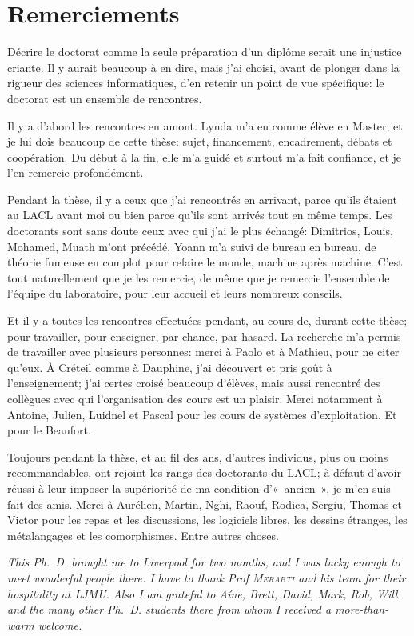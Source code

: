 \chapter{Remerciements}

Décrire le doctorat comme la seule préparation d'un diplôme serait une injustice criante.
Il y aurait beaucoup à en dire, mais j'ai choisi, avant de plonger dans la rigueur des sciences informatiques, d'en retenir un point de vue spécifique: le doctorat est un ensemble de rencontres.

Il y a d'abord les rencontres en amont.
Lynda m'a eu comme élève en Master, et je lui dois beaucoup de cette thèse: sujet, financement, encadrement, débats et coopération.
Du début à la fin, elle m'a guidé et surtout m'a fait confiance, et je l'en remercie profondément.

Pendant la thèse, il y a ceux que j'ai rencontrés en arrivant, parce qu'ils étaient au LACL avant moi ou bien parce qu'ils sont arrivés tout en même temps.
Les doctorants sont sans doute ceux avec qui j'ai le plus échangé: Dimitrios, Louis, Mohamed, Muath m'ont précédé, Yoann m'a suivi de bureau en bureau, de théorie fumeuse en complot pour refaire le monde, machine après machine.
C'est tout naturellement que je les remercie, de même que je remercie l'ensemble de l'équipe du laboratoire, pour leur accueil et leurs nombreux conseils.

Et il y a toutes les rencontres effectuées pendant, au cours de, durant cette thèse; pour travailler, pour enseigner, par chance, par hasard.
La recherche m'a permis de travailler avec plusieurs personnes: merci à Paolo et à Mathieu, pour ne citer qu'eux.
À Créteil comme à Dauphine, j'ai découvert et pris goût à l'enseignement; j'ai certes croisé beaucoup d'élèves, mais aussi rencontré des collègues avec qui l'organisation des cours est un plaisir.
Merci notamment à Antoine, Julien, Luidnel et Pascal pour les cours de systèmes d'exploitation.
Et pour le Beaufort.

Toujours pendant la thèse, et au fil des ans, d'autres individus, plus ou moins recommandables, ont rejoint les rangs des doctorants du LACL; à défaut d'avoir réussi à leur imposer la supériorité de ma condition d'« ancien », je m'en suis fait des amis.
Merci à Aurélien, Martin, Nghi, Raouf, Rodica, Sergiu, Thomas et Victor pour les repas et les discussions, les logiciels libres, les dessins étranges, les métalangages et les comorphismes.
Entre autres choses.

\vfil
{\it
This Ph.~D. brought me to Liverpool for two months, and I was lucky enough to meet wonderful people there.
I have to thank Prof \textsc{Merabti} and his team for their hospitality at LJMU.
Also I am grateful to Aíne, Brett, David, Mark, Rob, Will and the many other Ph.~D. students there from whom I received a more-than-warm welcome.
}
\vfil

